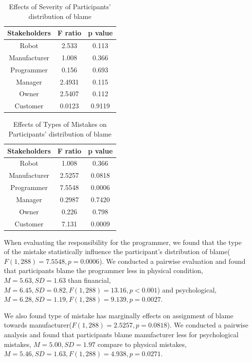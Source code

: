 \documentclass{sigchi}
\begin{document}
\begin{table}[h]
  \centering
  \begin{tabular}{|c|c|c|}
    \hline
    Stakeholders & F ratio & p value\\
    \hline
    Robot & 2.533 & 0.113\\
    \hline
    Manufacturer & 1.008 & 0.366\\
    \hline
    Programmer & 0.156 & 0.693 \\
    \hline
    Manager & 2.4931 & 0.115 \\
    \hline
    Owner & 2.5407 & 0.112 \\
    \hline
    Customer & 0.0123 & 0.9119 \\
    \hline
  \end{tabular}
  \caption{Effects of Severity of Participants' distribution of blame}
  \label{tab:table2}
\end{table}

\begin{table}[h]
  \centering
  \begin{tabular}{|c|c|c|}
    \hline
    Stakeholders & F ratio & p value\\
    \hline
    Robot & 1.008 & 0.366\\
    \hline
    Manufacturer & 2.5257 & 0.0818\\
    \hline
    Programmer & 7.5548 & 0.0006 \\
    \hline
    Manager & 0.2987 & 0.7420 \\
    \hline
    Owner & 0.226 & 0.798 \\
    \hline
    Customer & 7.131 & 0.0009 \\
    \hline
  \end{tabular}
  \caption{Effects of Types of Mistakes on Participants' distribution of blame}
  \label{tab:table2}
\end{table}


When evaluating the responsibility for the programmer, we found that the type of the mistake statistically influence the participant's distribution of blame($F(1,288)=7.5548, p = 0.0006$). We conducted a pairwise evaluation and found that participants blame the programmer less in physical condition, $M=5.63, SD=1.63$ than financial, $M=6.45, SD=0.82, F(1,288)=13.16, p < 0.001$) and psychological, $M=6.28, SD=1.19, F(1,288)=9.139, p = 0.0027$.

We also found type of mistake has marginally effects on assignment of blame towards manufacturer($F(1,288)=2.5257, p = 0.0818$). We conducted a pairwise analysis and found that participants blame manufacturer less for psychological mistakes, $M=5.00, SD=1.97$ compare to physical mistakes, $M=5.46, SD=1.63, F(1,288)=4.938, p=0.0271$.
\end{document}
